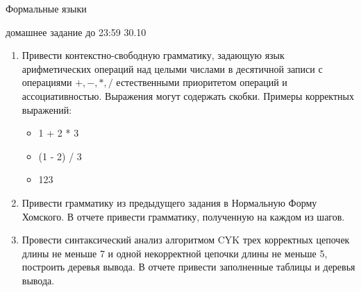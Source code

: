 \documentclass[12pt]{article}
\begin{document}
\begin{center} {\LARGE Формальные языки} \end{center}

\begin{center} \Large домашнее задание до 23:59 30.10 \end{center}
\bigskip

\begin{enumerate}
  \item Привести контекстно-свободную грамматику, задающую язык арифметических операций над целыми числами в десятичной записи с операциями $+, -, *, /$ естественными приоритетом операций и ассоциативностью. Выражения могут содержать скобки. Примеры корректных выражений:
  \begin{itemize}
    \item 1 + 2 * 3
    \item (1 - 2) / 3 
    \item 123 
  \end{itemize}
  \item Привести грамматику из предыдущего задания в Нормальную Форму Хомского. В отчете привести грамматику, полученную на каждом из шагов.
  \item Провести синтаксический анализ алгоритмом CYK трех корректных цепочек длины не меньше 7 и одной некорректной цепочки длины не меньше 5, построить деревья вывода. В отчете привести заполненные таблицы и деревья вывода. 
  \end{enumerate}
\end{document}
